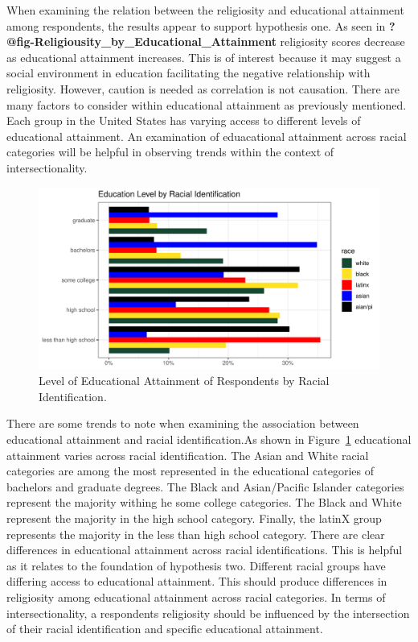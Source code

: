 \documentclass[
  12pt,
  letterpaper,
]{article}
\begin{document}
When examining the relation between the religiosity and educational
attainment among respondents, the results appear to support hypothesis
one. As seen in \textbf{?@fig-Religiousity\_by\_Educational\_Attainment}
religiosity scores decrease as educational attainment increases. This is
of interest because it may suggest a social environment in education
facilitating the negative relationship with religiosity. However,
caution is needed as correlation is not causation. There are many
factors to consider within educational attainment as previously
mentioned. Each group in the United States has varying access to
different levels of educational attainment. An examination of
eduacational attainment across racial categories will be helpful in
observing trends within the context of intersectionality.

\begin{figure}[!t]

{\centering \includegraphics{main_manuscript_files/figure-pdf/fig-Educational_Attainment_by_Race-1.pdf}

}

\caption{\label{fig-Educational_Attainment_by_Race}Level of Educational
Attainment of Respondents by Racial Identification.}

\end{figure}

There are some trends to note when examining the association between
educational attainment and racial identification.As shown in
Figure~\ref{fig-Educational_Attainment_by_Race} educational attainment
varies across racial identification. The Asian and White racial
categories are among the most represented in the educational categories
of bachelors and graduate degrees. The Black and Asian/Pacific Islander
categories represent the majority withing he some college categories.
The Black and White represent the majority in the high school category.
Finally, the latinX group represents the majority in the less than high
school category. There are clear differences in educational attainment
across racial identifications. This is helpful as it relates to the
foundation of hypothesis two. Different racial groups have differing
access to educational attainment. This should produce differences in
religiosity among educational attainment across racial categories. In
terms of intersectionality, a respondents religiosity should be
influenced by the intersection of their racial identification and
specific educational attainment.
\end{document}
